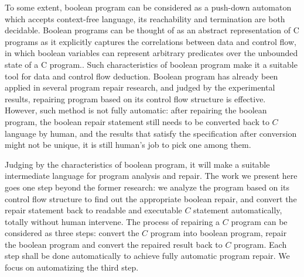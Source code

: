 \documentclass[10pt,journal,final,]{article}
\theoremstyle{definition}
\begin{document}
To some extent, boolean program can be considered as a push-down automaton which accepts context-free language, its reachability and termination are both decidable\cite{CFLaPDA}.
Boolean programs can be thought of as an abstract representation of C programs as it explicitly captures the correlations between data and control flow, in which boolean variables can represent arbitrary predicates over the unbounded state of a C program.\cite{APAoCP}.
Such characteristics of boolean program make it a suitable tool for data and control flow deduction.
Boolean program has already been applied in several program repair research\cite{RoBPwaAtC}, and judged by the experimental results, repairing program based on its control flow structure is effective.
However, such method is not fully automatic: after repairing the boolean program, the boolean repair statement still needs to be converted back to $C$ language by human, and the results that satisfy the specification after conversion might not be unique, it is still human's job to pick one among them.

Judging by the characteristics of boolean program, it will make a suitable intermediate language for program analysis and repair.
The work we present here goes one step beyond the former research: we analyze the program based on its control flow structure to find out the appropriate boolean repair, and convert the repair statement back to readable and executable $C$ statement automatically, totally without human intervene.
The process of repairing a $C$ program can be considered as three steps: convert the $C$ program into boolean program, repair the boolean program and convert the repaired result back to $C$ program. Each step shall be done automatically to achieve fully automatic program repair.
We focus on automatizing the third step.
\end{document}
